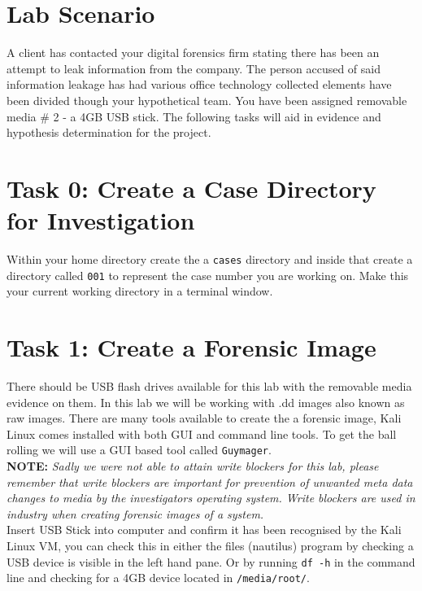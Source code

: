 \documentclass[a4paper,11pt]{article}
\begin{document}
\section{Lab Scenario}
A client has contacted your digital forensics firm stating there has been an attempt to leak information from the company. The person accused of said information leakage has had various office technology collected elements have been divided though your hypothetical team. You have been assigned removable media {\#} 2 - a 4GB USB stick. The following tasks will aid in evidence and hypothesis determination for the project.

\section{Task 0: Create a Case Directory for Investigation}
Within your home directory create the a \texttt{cases} directory and inside that create a directory called \texttt{001} to represent the case number you are working on. Make this your current working directory in a terminal window.

\section{Task 1: Create a Forensic Image}\label{sec:task1-forensic-image}
There should be USB flash drives available for this lab with the removable media evidence on them.  In this lab we will be working with .dd images also known as raw images. There are many tools available to create the a forensic image, Kali Linux comes installed with both GUI and command line tools. To get the ball rolling we will use a GUI based tool called \texttt{Guymager}.\\

\textbf{NOTE:} \textit{Sadly we were not able to attain write blockers for this lab, please remember that write blockers are important for prevention of unwanted meta data changes to media by the investigators operating system. Write blockers are used in industry when creating forensic images of a system.}\\

Insert USB Stick into computer and confirm it has been recognised by the Kali Linux VM, you can check this in either the files (nautilus) program by checking a USB device is visible in the left hand pane. Or by running \texttt{df -h} in the command line and checking for a 4GB device located in \texttt{/media/root/}. \\
\end{document}
